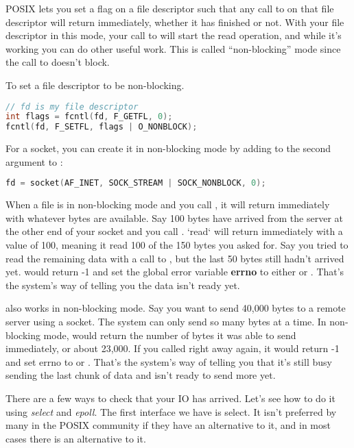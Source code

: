 POSIX lets you set a flag on a file descriptor such that any call to  on that file descriptor will return immediately, whether it has finished or not.
With your file descriptor in this mode, your call to  will start the read operation, and while it's working you can do other useful work.
This is called ``non-blocking'' mode since the call to  doesn't block.

To set a file descriptor to be non-blocking.

\begin{lstlisting}[language=C]
// fd is my file descriptor
int flags = fcntl(fd, F_GETFL, 0);
fcntl(fd, F_SETFL, flags | O_NONBLOCK);
\end{lstlisting}

For a socket, you can create it in non-blocking mode by adding  to the second argument to :

\begin{lstlisting}[language=C]
fd = socket(AF_INET, SOCK_STREAM | SOCK_NONBLOCK, 0);
\end{lstlisting}

When a file is in non-blocking mode and you call , it will return immediately with whatever bytes are available.
Say 100 bytes have arrived from the server at the other end of your socket and you call .
`read` will return immediately with a value of 100, meaning it read 100 of the 150 bytes you asked for.
Say you tried to read the remaining data with a call to , but the last 50 bytes still hadn't arrived yet.
 would return -1 and set the global error variable \textbf{errno} to either  or .
That's the system's way of telling you the data isn't ready yet.

 also works in non-blocking mode.
Say you want to send 40,000 bytes to a remote server using a socket.
The system can only send so many bytes at a time.
In non-blocking mode,  would return the number of bytes it was able to send immediately, or about 23,000.
If you called  right away again, it would return -1 and set errno to  or .
That's the system's way of telling you that it's still busy sending the last chunk of data and isn't ready to send more yet.

There are a few ways to check that your IO has arrived.
Let's see how to do it using \emph{select} and \emph{epoll}.
The first interface we have is select.
It isn't preferred by many in the POSIX community if they have an alternative to it, and in most cases there is an alternative to it.

